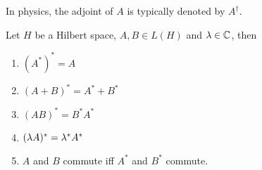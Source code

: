 \documentclass{book}
\begin{document}
\begin{note}
	In physics, the adjoint of $A$ is typically denoted by $A^{\dagger}$.
\end{note}

\begin{ex} \lex{}
	Let $H$ be a Hilbert space, $A, B \in L(H)$ and $\lambda \in \mathbb{C}$, then \begin{enumerate}
		\item $(A^{*})^{*} = A$
		\item $(A + B)^{*} = A^{*} + B^{*}$
		\item $(AB)^{*} = B^{*}A^{*}$
		\item $(\lambda A)^{*} = \lambda^*A^{*}$
		\item $A$ and $B$ commute iff $A^{*}$ and $B^{*}$ commute.
	\end{enumerate}
\end{ex}
\end{document}
